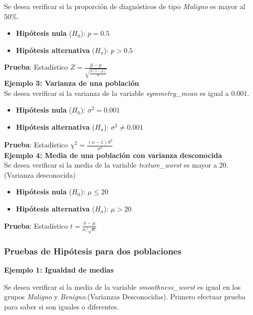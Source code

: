 \documentclass[a4paper, 12pt]{article}
\begin{document}
Se desea verificar si la proporción de diagnósticos de tipo \textit{Maligno} es mayor al 50\%.

\begin{itemize}
	\item \textbf{Hipótesis nula} (\(H_0\)): \(p = 0.5\)
	\item \textbf{Hipótesis alternativa} (\(H_a\)): \(p > 0.5\)
\end{itemize}

\textbf{Prueba}: Estadístico \( Z = \frac{\hat{p} - p}{\sqrt{\frac{p(1-p)}{n}}} \)\\

\textbf{Ejemplo 3: Varianza de una población}\\

Se desea verificar si la varianza de la variable \textit{symmetry\_mean} es igual a 0.001. 

\begin{itemize}
	\item \textbf{Hipótesis nula} (\(H_0\)): \(\sigma^2 = 0.001\)
	\item \textbf{Hipótesis alternativa} (\(H_a\)): \(\sigma^2 \neq 0.001\)
\end{itemize}

\textbf{Prueba}: Estadístico \(\chi^2 = \frac{(n-1)S^2}{\sigma^2}\)\\
\textbf{Ejemplo 4: Media de una población con varianza desconocida}\\

Se desea verificar si la media de la variable \textit{texture\_worst} es mayor a 20.(Varianza desconocida)

\begin{itemize}
	\item \textbf{Hipótesis nula} (\(H_0\)): \(\mu \leq 20\)
	\item \textbf{Hipótesis alternativa} (\(H_a\)): \(\mu > 20\)
\end{itemize}

\textbf{Prueba}: Estadístico \( t = \frac{\bar{x} - \mu}{\sigma / \sqrt{n}} \)\\

\subsubsection{Pruebas de Hipótesis para dos poblaciones}

\textbf{Ejemplo 1: Igualdad de medias}

Se desea verificar si la media de la variable \textit{smoothness\_worst} es igual en los grupos \textit{Maligno} y \textit{Benigno}.(Varianzas Desconocidas).
Primero efectuar prueba para saber si son iguales o diferentes.
\end{document}
